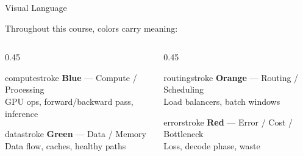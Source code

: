 \documentclass[aspectratio=169, 12pt]{beamer}
\begin{document}
\begin{frame}{Visual Language}

\small
Throughout this course, colors carry meaning:

\vspace{0.3cm}
\begin{columns}[T]
  \begin{column}{0.45\textwidth}
    \begin{mlsyscard}{computestroke}
    \textbf{Blue} --- Compute / Processing\\
    {\footnotesize GPU ops, forward/backward pass, inference}
    \end{mlsyscard}
    \vspace{0.15cm}
    \begin{mlsyscard}{datastroke}
    \textbf{Green} --- Data / Memory\\
    {\footnotesize Data flow, caches, healthy paths}
    \end{mlsyscard}
  \end{column}
  \begin{column}{0.45\textwidth}
    \begin{mlsyscard}{routingstroke}
    \textbf{Orange} --- Routing / Scheduling\\
    {\footnotesize Load balancers, batch windows}
    \end{mlsyscard}
    \vspace{0.15cm}
    \begin{mlsyscard}{errorstroke}
    \textbf{Red} --- Error / Cost / Bottleneck\\
    {\footnotesize Loss, decode phase, waste}
    \end{mlsyscard}
  \end{column}
\end{columns}
\end{frame}
\end{document}
